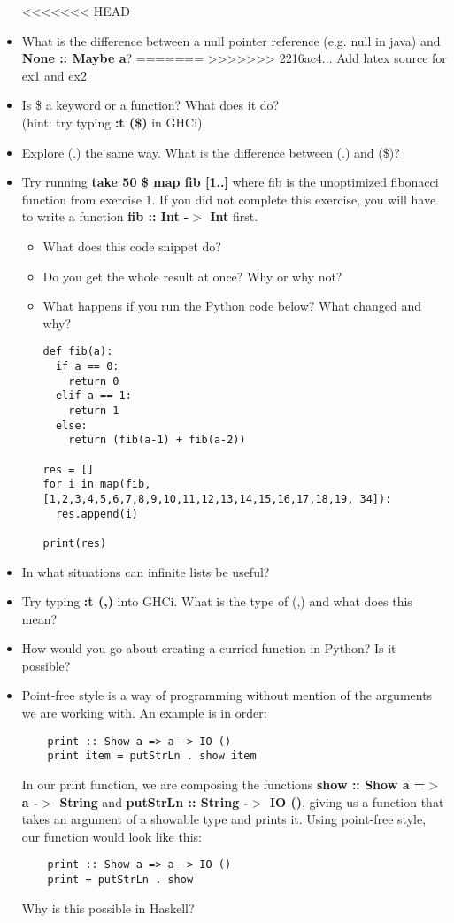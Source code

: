 \documentclass{article}
\begin{document}
\begin{itemize}
<<<<<<< HEAD
    \item What is the difference between a null pointer reference (e.g. null in java) and \textbf{None :: Maybe a}?
=======
>>>>>>> 2216ac4... Add latex source for ex1 and ex2
    \item Is \$ a keyword or a function? What does it do?\\ (hint: try typing \textbf{:t (\$)} in GHCi)
    \item Explore (.) the same way. What is the difference between (.) and (\$)?
    \item Try running \textbf{take 50 \$ map fib [1..]} where fib is the unoptimized fibonacci function from exercise 1. If you did not complete this exercise, you will have to write a function \textbf{fib :: Int -$>$ Int} first.\\
    \begin{itemize}
        \item What does this code snippet do?
        \item Do you get the whole result at once? Why or why not?
        \item What happens if you run the Python code below? What changed and why?
\lstset{language=Python}
\begin{lstlisting}
def fib(a):
  if a == 0:
    return 0
  elif a == 1:
    return 1
  else:
    return (fib(a-1) + fib(a-2))

res = []
for i in map(fib, [1,2,3,4,5,6,7,8,9,10,11,12,13,14,15,16,17,18,19, 34]):
  res.append(i)

print(res)
\end{lstlisting}
    \end{itemize}
    \item In what situations can infinite lists be useful?
    \item Try typing \textbf{:t (,)} into GHCi. What is the type of (,) and what does this mean?
    \item How would you go about creating a curried function in Python? Is it possible?
    \item Point-free style is a way of programming without mention of the arguments we are working with. An example is in order:
    \lstset{language=Haskell}
    \begin{lstlisting}
    print :: Show a => a -> IO ()
    print item = putStrLn . show item
    \end{lstlisting}
    In our print function, we are composing the functions \textbf{show :: Show a =$>$ a -$>$ String} and \textbf{putStrLn :: String -$>$ IO ()}, giving us a function that takes an argument of a showable type and prints it. Using point-free style, our function would look like this:
    \lstset{language=Haskell}
    \begin{lstlisting}
    print :: Show a => a -> IO ()
    print = putStrLn . show
    \end{lstlisting}
    Why is this possible in Haskell?
\end{itemize}
\end{document}
